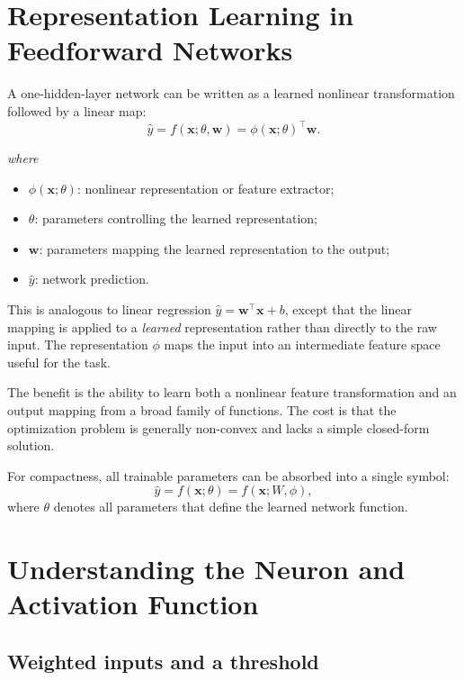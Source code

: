 \documentclass[11pt,a4paper]{report}
\newcommand{\vect}[1]{\bm{#1}}
\newcommand{\wherelegend}{\par\smallskip\textit{where}\vspace{-0.3em}}
\begin{document}
\section{Representation Learning in Feedforward Networks}

A one-hidden-layer network can be written as a learned nonlinear transformation followed by a linear map:
\begin{equation}
  \hat y=f(\vect{x};\theta,\vect{w})=\phi(\vect{x};\theta)^{\top}\vect{w}.
  \label{eq:phi-model}
\end{equation}
\wherelegend
\begin{itemize}
  \item $\phi(\vect{x};\theta)$: nonlinear representation or feature extractor;
  \item $\theta$: parameters controlling the learned representation;
  \item $\vect{w}$: parameters mapping the learned representation to the output;
  \item $\hat y$: network prediction.
\end{itemize}

This is analogous to linear regression $\hat y=\vect{w}^{\top}\vect{x}+b$, except that the linear mapping is applied to a \emph{learned} representation rather than directly to the raw input. The representation $\phi$ maps the input into an intermediate feature space useful for the task.

The benefit is the ability to learn both a nonlinear feature transformation and an output mapping from a broad family of functions. The cost is that the optimization problem is generally non-convex and lacks a simple closed-form solution.

For compactness, all trainable parameters can be absorbed into a single symbol:
\begin{equation}
  \hat y=f(\vect{x};\theta)=f(\vect{x};W,\phi),
  \label{eq:dnn-notation}
\end{equation}
where $\theta$ denotes all parameters that define the learned network function.

\section{Understanding the Neuron and Activation Function}

\subsection{Weighted inputs and a threshold}
\end{document}
